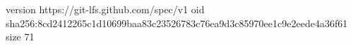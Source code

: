 version https://git-lfs.github.com/spec/v1
oid sha256:8cd2412265c1d10699baa83c23526783c76ea9d3c85970ee1c9e2eede4a36f61
size 71
